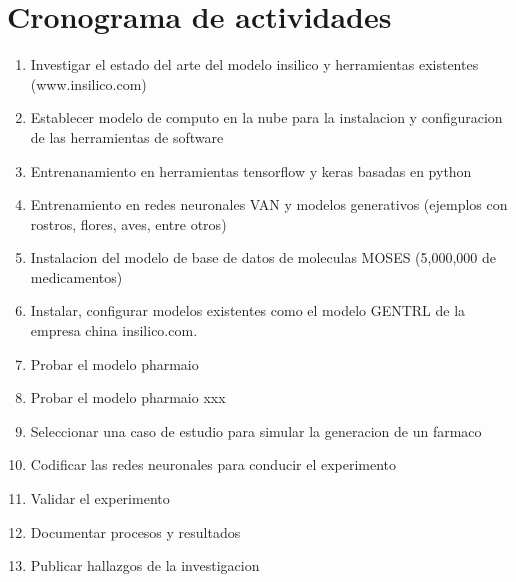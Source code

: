 \documentclass[12pt]{article}
\begin{document}
\section{Cronograma de actividades}\label{Cronograma de actividades}
\begin{enumerate}

 \item Investigar el estado del arte del modelo insilico y herramientas existentes (www.insilico.com)
 \item Establecer modelo de computo en la nube para la instalacion y configuracion de las herramientas de software
 \item Entrenanamiento en herramientas tensorflow y keras basadas en python
 \item Entrenamiento en redes neuronales VAN y modelos generativos (ejemplos con rostros, flores, aves, entre otros)
 \item Instalacion del modelo de base de datos de moleculas MOSES (5,000,000 de medicamentos)
 \item Instalar, configurar modelos existentes como el modelo GENTRL de la empresa china insilico.com.
 \item Probar el modelo pharmaio
 \item Probar el modelo pharmaio xxx
 \item Seleccionar una caso de estudio para simular la generacion de un farmaco
 \item Codificar las redes neuronales para conducir el experimento
 \item Validar el experimento
 \item Documentar procesos y resultados
 \item Publicar hallazgos de la investigacion

\end{enumerate}



\end{document}
